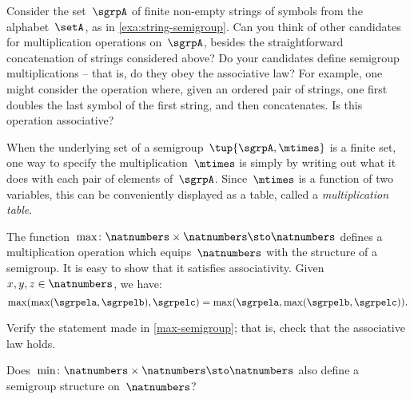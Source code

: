\begin{gradedexercise}
  \label{ex:alphabet}
  Consider the set~$\sgrpA$ of finite non-empty strings of symbols from the alphabet~$\setA$, as in \cref{exa:string-semigroup}.
  Can you think of other candidates for multiplication operations on~$\sgrpA$, besides the straightforward concatenation of strings considered above?
  Do your candidates define semigroup multiplications -- that is, do they obey the associative law?
  For example, one might consider the operation where, given an ordered pair of strings, one first doubles the last symbol of the first string, and then concatenates.
  Is this operation associative?
\end{gradedexercise}
\begin{solution}
\end{solution}

When the underlying set of a semigroup~$\tup{\sgrpA, \mtimes}$ is a finite set, one way to specify the multiplication~$\mtimes$ is simply by writing out what it does with each pair of elements of~$\sgrpA$.
Since~$\mtimes$ is a function of two variables, this can be conveniently displayed as a table, called a \emph{multiplication table}.





\begin{example}
  \label{max-semigroup}
  The function~$\max \colon \natnumbers \times \natnumbers \sto \natnumbers$ defines a multiplication operation which equips~$\natnumbers$ with the structure of a semigroup.
  It is easy to show that it satisfies associativity. Given~$x,y,z\in \natnumbers$, we have:
  \begin{equation*}
    \label{eq:max-assoc}
    \max(\max(\sgrpela,\sgrpelb),\sgrpelc)=\max(\sgrpela,\max(\sgrpelb,\sgrpelc)).
  \end{equation*}
\end{example}

\begin{exercise}
  \label{ex:max-semigroup}
  Verify the statement made in \cref{max-semigroup}; that is, check that the associative law holds.

  Does~$\min \colon \natnumbers \times \natnumbers \sto \natnumbers$ also define a semigroup structure on~$\natnumbers$?
\end{exercise}
\begin{solution}
\end{solution}

